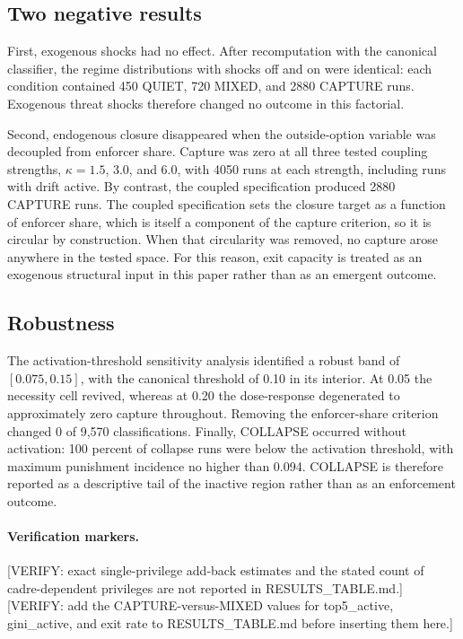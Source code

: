 \subsection{Two negative results}

First, exogenous shocks had no effect. After recomputation with the canonical classifier, the regime distributions with shocks off and on were identical: each condition contained 450 QUIET, 720 MIXED, and 2880 CAPTURE runs. Exogenous threat shocks therefore changed no outcome in this factorial.

Second, endogenous closure disappeared when the outside-option variable was decoupled from enforcer share. Capture was zero at all three tested coupling strengths, $\kappa=1.5$, 3.0, and 6.0, with 4050 runs at each strength, including runs with drift active. By contrast, the coupled specification produced 2880 CAPTURE runs. The coupled specification sets the closure target as a function of enforcer share, which is itself a component of the capture criterion, so it is circular by construction. When that circularity was removed, no capture arose anywhere in the tested space. For this reason, exit capacity is treated as an exogenous structural input in this paper rather than as an emergent outcome.

\subsection{Robustness}

The activation-threshold sensitivity analysis identified a robust band of $[0.075,0.15]$, with the canonical threshold of 0.10 in its interior. At 0.05 the necessity cell revived, whereas at 0.20 the dose-response degenerated to approximately zero capture throughout. Removing the enforcer-share criterion changed 0 of 9,570 classifications. Finally, COLLAPSE occurred without activation: 100 percent of collapse runs were below the activation threshold, with maximum punishment incidence no higher than 0.094. COLLAPSE is therefore reported as a descriptive tail of the inactive region rather than as an enforcement outcome.

\paragraph{Verification markers.}
[VERIFY: exact single-privilege add-back estimates and the stated count of cadre-dependent privileges are not reported in RESULTS_TABLE.md.]
[VERIFY: add the CAPTURE-versus-MIXED values for top5_active, gini_active, and exit rate to RESULTS_TABLE.md before inserting them here.]
